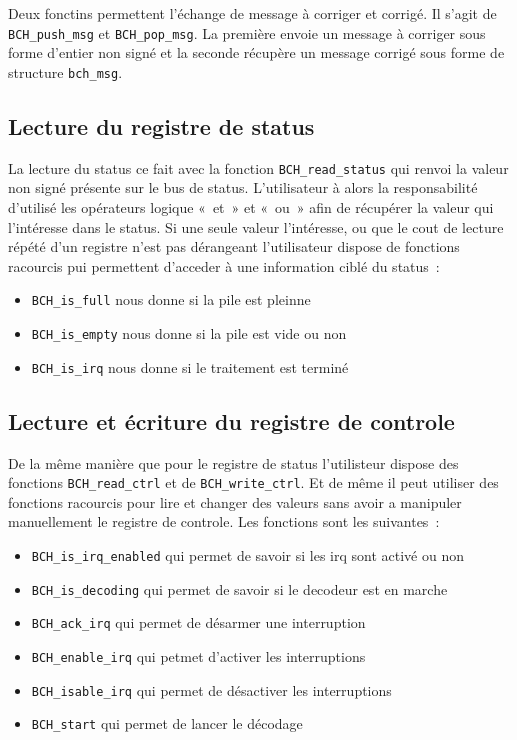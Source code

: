 \documentclass[a4paper, 11pt, svgnames]{report}
\begin{document}
    Deux fonctins permettent l'échange de message à corriger et corrigé. Il
    s'agit de \verb$BCH_push_msg$ et \verb$BCH_pop_msg$. La première envoie un
    message à corriger sous forme d'entier non signé et la seconde récupère un
    message corrigé sous forme de structure \verb$bch_msg$.

    \subsection{Lecture du registre de status}

    La lecture du status ce fait avec la fonction \verb$BCH_read_status$ qui
    renvoi la valeur non signé présente sur le bus de status. L'utilisateur à
    alors la responsabilité d'utilisé les opérateurs logique «~et~» et «~ou~»
    afin de récupérer la valeur qui l'intéresse dans le status. Si une seule
    valeur l'intéresse, ou que le cout de lecture répété d'un registre n'est
    pas dérangeant l'utilisateur dispose de fonctions racourcis pui permettent
    d'acceder à une information ciblé du status~:
    \begin{itemize}
        \item \verb$BCH_is_full$ nous donne si la pile est pleinne
        \item \verb$BCH_is_empty$ nous donne si la pile est vide ou non
        \item \verb$BCH_is_irq$ nous donne si le traitement est terminé
    \end{itemize}

    \subsection{Lecture et écriture du registre de controle}

    De la même manière que pour le registre de status l'utilisteur dispose des
    fonctions \verb$BCH_read_ctrl$ et de \verb$BCH_write_ctrl$. Et de même il
    peut utiliser des fonctions racourcis pour lire et changer des valeurs sans
    avoir a manipuler manuellement le registre de controle. Les fonctions sont
    les suivantes~:
    \begin{itemize}
        \item \verb$BCH_is_irq_enabled$ qui permet de savoir si les irq sont activé ou non
        \item \verb$BCH_is_decoding$ qui permet de savoir si le decodeur est en marche
        \item \verb$BCH_ack_irq$ qui permet de désarmer une interruption
        \item \verb$BCH_enable_irq$ qui petmet d'activer les interruptions
        \item \verb$BCH_isable_irq$ qui permet de désactiver les interruptions
        \item \verb$BCH_start$ qui permet de lancer le décodage
    \end{itemize}
\end{document}
